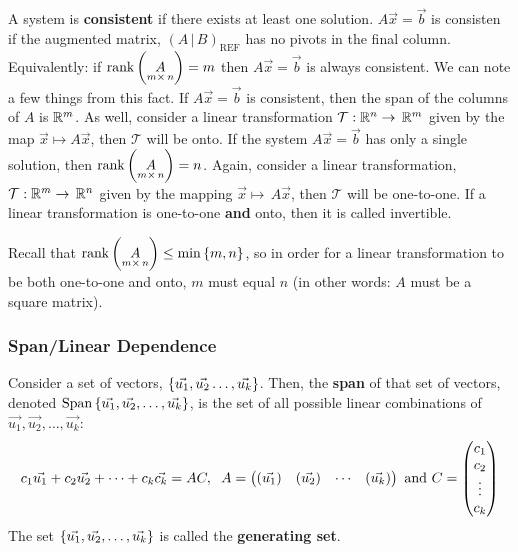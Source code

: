 A system is \textbf{consistent} if there exists at least one solution. $A\vec{x}=\vec{b}$ is consisten if the augmented matrix, $\left(A\,|\,B\right)_{\text{REF}}$ has no pivots in the final column. Equivalently: if $\text{rank}\left(\underset{m\times\,n}{A}\right)=m$ then $A\vec{x}=\vec{b}$ is always consistent. We can note a few things from this fact. If $A\vec{x}=\vec{b}$ is consistent, then the span of the columns of $A$ is $\mathbb R^{m}$. As well, consider a linear transformation $\mathcal{T}:\mathbb R^{n}\to\,\mathbb R^{m}$ given by the map $\vec{x} \mapsto A\vec{x}$, then $\mathcal{T}$ will be onto. If the system $A\vec{x}=\vec{b}$ has only a single solution, then $\text{rank}\left(\underset{m\times\,n}{A}\right) = n$. Again, consider a linear transformation, $\mathcal{T}:\mathbb R^{m}\to\,\mathbb R^{n}$ given by the mapping $\vec{x}\mapsto\,A\vec{x}$, then $\mathcal{T}$ will be one-to-one. If a linear transformation is one-to-one \textbf{and} onto, then it is called invertible.

\begin{impbox}{}{}
    Recall that $\text{rank}\left(\underset{m\times\,n}{A}\right) \leq \min\left\{m, n \right\}$, so in order for a linear transformation to be both one-to-one and onto, $m$ must equal $n$ (in other words: $A$ must be a square matrix).
\end{impbox}

\subsubsection*{Span/Linear Dependence}
Consider a set of vectors, $\left\{\vec{u_1}, \vec{u_2} \dots, \vec{u_k} \right\}$. Then, the \textbf{span} of that set of vectors, denoted $\text{Span}\left\{\vec{u_1}, \vec{u_2}, \dots, \vec{u_k} \right\}$, is the set of all possible linear combinations of $\vec{u_1}, \vec{u_2}, \dots, \vec{u_k}$: 
\[
    c_1\vec{u_1} + c_2\vec{u_2} + \cdots + c_k\vec{c_k} = AC, \hspace{0.2cm} 
    A = \begin{pmatrix}
        \left(\vec{u_1}\right) & \left(\vec{u_2}\right) & \cdots & \left(\vec{u_k}\right) 
    \end{pmatrix}
    \text{ and }
    C = \begin{pmatrix}
        c_1 \\ c_2 \\ \vdots \\ c_k
    \end{pmatrix}
\]
The set $\left\{\vec{u_1}, \vec{u_2}, \dots, \vec{u_k} \right\}$ is called the \textbf{generating set}.

